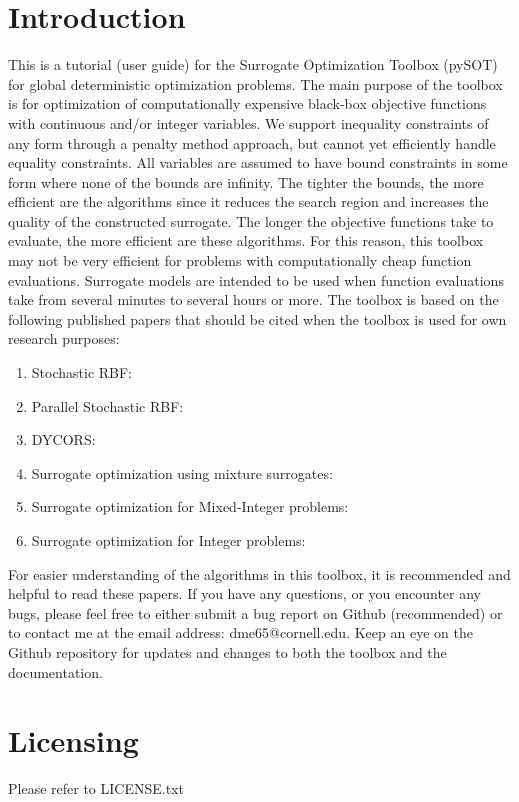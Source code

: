 \documentclass[]{article}
\begin{document}
\section{Introduction}
This is a tutorial (user guide) for the Surrogate Optimization Toolbox (pySOT) for global deterministic 
optimization problems. The main purpose of the toolbox is for optimization of computationally expensive 
black-box objective functions with continuous and/or integer variables. We support inequality constraints 
of any form through a penalty method approach, but cannot yet efficiently handle equality constraints. 
All variables are assumed to have bound constraints in some form where none of the bounds are infinity. 
The tighter the bounds, the more efficient are the algorithms since it reduces the search region and 
increases the quality of the constructed surrogate. The longer the objective functions take to evaluate, 
the more efficient are these algorithms. For this reason, this toolbox may not be very efficient for problems 
with computationally cheap function evaluations. Surrogate models are intended to be used when function
 evaluations take from several minutes to several hours or more. The toolbox is based on the following 
 published papers that should be cited when the toolbox is used for own research purposes:
\begin{enumerate}
\item Stochastic RBF: \cite{regis2007stochastic}
\item Parallel Stochastic RBF: \cite{regis2009parallel}
\item DYCORS: \cite{regis2013combining}
\item Surrogate optimization using mixture surrogates: \cite{muller2011mixture}
\item Surrogate optimization for Mixed-Integer problems: \cite{muller2013so}
\item Surrogate optimization for Integer problems: \cite{muller2014so}
\end{enumerate}
For easier understanding of the algorithms in this toolbox, it is recommended and helpful to read these 
papers. If you have any questions, or you encounter any bugs, please feel free to either submit a bug 
report on Github (recommended) or to contact me at the email address: dme65@cornell.edu. Keep 
an eye on the Github repository for updates and changes to both the toolbox and the documentation.

\section{Licensing} Please refer to LICENSE.txt
\end{document}
